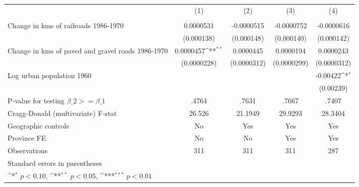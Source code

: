 {
\def\sym#1{\ifmmode^{#1}\else\(^{#1}\)\fi}
\begin{tabular}{l*{4}{c}}
\hline\hline
                &\multicolumn{1}{c}{(1)}&\multicolumn{1}{c}{(2)}&\multicolumn{1}{c}{(3)}&\multicolumn{1}{c}{(4)}\\
                &\multicolumn{1}{c}{}&\multicolumn{1}{c}{}&\multicolumn{1}{c}{}&\multicolumn{1}{c}{}\\
\hline
Change in kms of railroads 1986-1970&0.0000531         &-0.0000515         &-0.0000752         &-0.0000616         \\
                &(0.000138)         &(0.000148)         &(0.000140)         &(0.000142)         \\
[1em]
Change in kms of paved and gravel roads 1986-1970&0.0000457\sym{**} &0.0000445         &0.0000194         &0.0000243         \\
                &(0.0000228)         &(0.0000312)         &(0.0000299)         &(0.0000312)         \\
[1em]
Log urban population 1960&                  &                  &                  & -0.00422\sym{*}  \\
                &                  &                  &                  &(0.00239)         \\
\hline
P-value for testing $\beta\_{2} >= \beta\_{1}$&    .4764         &    .7631         &    .7667         &    .7407         \\
Cragg-Donald (multivariate) F-stat&   26.526         &  21.1949         &  29.9293         &  28.3404         \\
Geographic controls&       No         &      Yes         &      Yes         &      Yes         \\
Province FE     &       No         &       No         &      Yes         &      Yes         \\
Observations    &      311         &      311         &      311         &      287         \\
\hline\hline
\multicolumn{5}{l}{\footnotesize Standard errors in parentheses}\\
\multicolumn{5}{l}{\footnotesize \sym{*} \(p<0.10\), \sym{**} \(p<0.05\), \sym{***} \(p<0.01\)}\\
\end{tabular}
}
